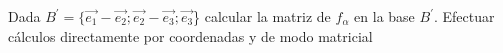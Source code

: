\documentclass[11pt]{article}
\begin{document}
\begin{question}
\begin{subquestion}{Dada $B^{'}=\{\Vec{e_{1}}-\Vec{e_{2}};\Vec{e_{2}}-\Vec{e_{3}};\Vec{e_{3}}$\} calcular la matriz de $f_{\alpha}$ en la base $B^{'}$. Efectuar cálculos directamente por coordenadas y de modo matricial}
{            %
        }
    \end{subquestion}
\end{question}
\fi


\end{document}
